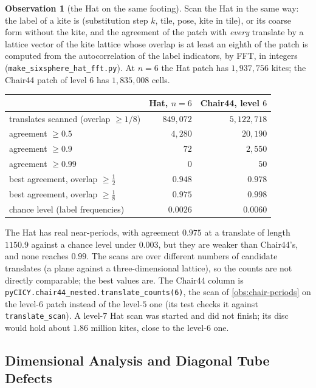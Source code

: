 \documentclass[11pt,a4paper]{article}
\theoremstyle{plain}
\theoremstyle{definition}
\newtheorem{observation}{Observation}
\begin{document}
\begin{observation}[the Hat on the same footing]
\label{obs:hat-fft}
Scan the Hat in the same way: the label of a kite is (substitution step $k$, tile, pose,
kite in tile), or its coarse form without the kite, and the agreement of the patch with
\emph{every} translate by a lattice vector of the kite lattice whose overlap is at least
an eighth of the patch is computed from the autocorrelation of the label indicators, by
FFT, in integers (\texttt{make\_sixsphere\_hat\_fft.py}). At $n=6$ the Hat patch has
$1{,}937{,}756$ kites; the Chair44 patch of level $6$ has $1{,}835{,}008$ cells.
\begin{center}
\small
\begin{tabular}{lrr}
\toprule
 & Hat, $n=6$ & Chair44, level $6$\\
\midrule
translates scanned (overlap $\ge1/8$) & $849{,}072$ & $5{,}122{,}718$\\
agreement $\ge0.5$ & $4{,}280$ & $20{,}190$\\
agreement $\ge0.9$ & $72$ & $2{,}550$\\
agreement $\ge0.99$ & $0$ & $50$\\
best agreement, overlap $\ge\tfrac12$ & $0.948$ & $0.978$\\
best agreement, overlap $\ge\tfrac18$ & $0.975$ & $0.998$\\
chance level (label frequencies) & $0.0026$ & $0.0060$\\
\bottomrule
\end{tabular}
\end{center}
The Hat has real near-periods, with agreement $0.975$ at a translate of length
$1150.9$ against a chance level under $0.003$, but they are weaker than Chair44's, and
none reaches $0.99$. The scans are over different numbers of candidate translates (a
plane against a three-dimensional lattice), so the counts are not directly comparable;
the best values are. The Chair44 column is
\texttt{pyCICY.chair44\_nested.translate\_counts(6)}, the scan of
\cref{obs:chair-periods} on the level-$6$ patch instead of the level-$5$ one (its test
checks it against \texttt{translate\_scan}). A level-$7$ Hat scan was
started and did not finish; its disc would hold about $1.86$ million kites, close to the level-$6$ one.
\end{observation}

\subsection{Dimensional Analysis and Diagonal Tube Defects}
\label{sec:chair-undet}
\end{document}
